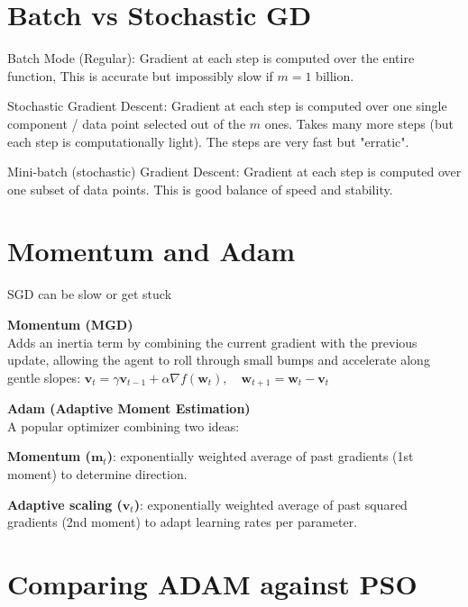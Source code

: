 \section*{Batch vs Stochastic GD}

\begin{tightitemize}
    \item Batch Mode (Regular): Gradient at each step is computed over the entire function,
    This is accurate but impossibly slow if $m = 1$ billion.
    \item Stochastic Gradient Descent: Gradient at each step is
    computed over one single component / data point selected out of the $m$ ones.
    Takes many more steps (but each step is computationally light). The steps are very fast but "erratic".
    \item Mini-batch (stochastic) Gradient Descent: Gradient at each step is computed
    over one subset of data points. This is good balance of speed and stability.
\end{tightitemize}

\section*{Momentum and Adam}

SGD can be slow or get stuck

\textbf{Momentum (MGD)}\\
Adds an inertia term by combining the current gradient with the previous update, allowing the agent to roll through small bumps and accelerate along gentle slopes:
$
\mathbf{v}_t = \gamma \mathbf{v}_{t-1} + \alpha \nabla f(\mathbf{w}_t), \quad
\mathbf{w}_{t+1} = \mathbf{w}_t - \mathbf{v}_t
$

\textbf{Adam (Adaptive Moment Estimation)}\\
A popular optimizer combining two ideas:
\begin{tightitemize}
    \item \textbf{Momentum ($\mathbf{m}_t$)}: exponentially weighted average of past gradients (1st moment) to determine direction.
    \item \textbf{Adaptive scaling ($\mathbf{v}_t$)}: exponentially weighted average of past squared gradients (2nd moment) to adapt learning rates per parameter.
\end{tightitemize}

\section*{Comparing ADAM against PSO}


